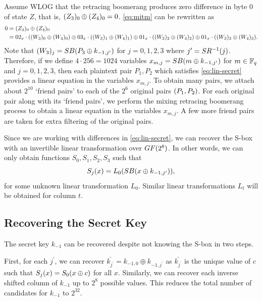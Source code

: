\documentclass[twoside]{article}
\begin{document}
Assume WLOG that the retracing boomerang produces zero difference in byte 0 of
state \(Z\), that is, \((Z_3)_0 \oplus (Z_4)_0 = 0\). \eqref{eq:mitm}
can be rewritten as
\begin{align}
    0 &= (Z_3)_0 \oplus (Z_4)_0 \\
    &= 02_x \cdot ((W_3)_0 \oplus (W_4)_0) \oplus 03_x \cdot ((W_3)_1 \oplus (W_4)_1) \oplus 01_x \cdot ((W_3)_2 \oplus (W_4)_2) \oplus 01_x \cdot ((W_3)_3 \oplus (W_4)_3).
    \label{eq:lin-secret}
\end{align}
Note that \((W_3)_j = SB(P_3 \oplus k_{-1, j^\prime})\) for \(j = 0,
1, 2, 3\) where \(j^\prime = SR^{-1}(j)\). Therefore, if we define \(4
\cdot 256 = 1024\) variables \(x_{m,j} = SB(m \oplus k_{-1, j^\prime})\)
for \(m \in \mathbb F_q\) and \(j = 0, 1, 2, 3\), then each plaintext pair \(P_1,
P_2\) which satisfies \eqref{eq:lin-secret} provides a linear equation in the
variables \(x_{m,j}\). To obtain many pairs, we attach about \(2^{10}\) `friend
pairs' to each of the \(2^6\) original pairs \((P_1, P_2)\). For each
original pair along with its `friend pairs', we perform the mixing retracing
boomerang process to obtain a linear equation in the variables \(x_{m, j}\). A
few more friend pairs are taken for extra filtering of the original pairs.

Since we are working with differences in \eqref{eq:lin-secret}, we can recover
the S-box with an invertible linear transformation over \(GF(2^8)\). In
other words, we can only obtain functions \(S_0, S_1, S_2, S_3\) such that
\begin{equation}
    S_j(x) = L_0(SB(x \oplus k_{-1, j^\prime})),
\end{equation}
for some unknown linear transformation \(L_0\). Similar linear transformations
\(L_t\) will be obtained for column \(t\).

\subsection{Recovering the Secret Key}

The secret key \(k_{-1}\) can be recovered despite not knowing the S-box in two
steps.

First, for each \(j^\prime\), we can recover \(\bar{k_{j^\prime}} = k_{-1, 0}
\oplus k_{-1, {j^\prime}}\) as \(\bar{k_{j^\prime}}\) is the unique value of
\(c\) such that \(S_j(x) = S_0(x \oplus c)\) for all \(x\). Similarly,
we can recover each inverse shifted column of \(k_{-1}\) up to \(2^8\) possible
values. This reduces the total number of candidates for \(k_{-1}\) to
\(2^{32}\).
\end{document}
